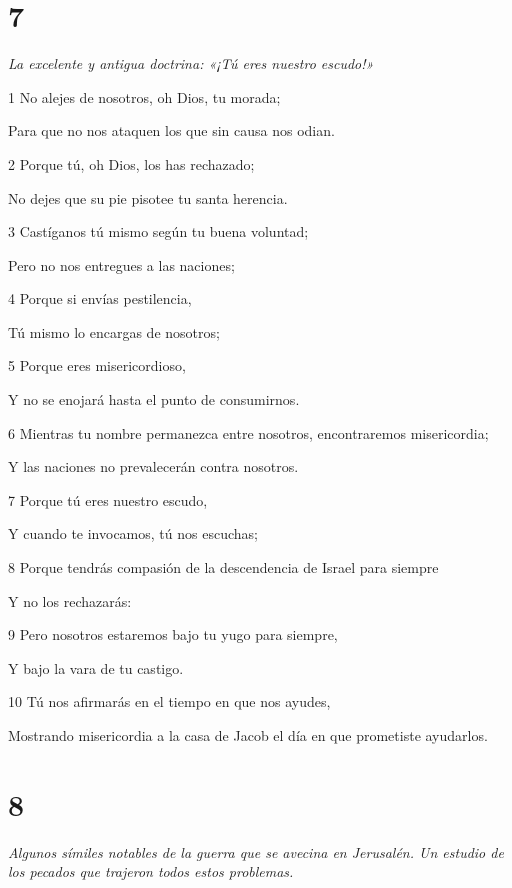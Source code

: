 \chapter{7}

\par \textit{La excelente y antigua doctrina: «¡Tú eres nuestro escudo!»}

\par 1 No alejes de nosotros, oh Dios, tu morada;
\par     Para que no nos ataquen los que sin causa nos odian.
\par 2 Porque tú, oh Dios, los has rechazado;
\par     No dejes que su pie pisotee tu santa herencia.
\par 3 Castíganos tú mismo según tu buena voluntad;
\par     Pero no nos entregues a las naciones;
\par 4 Porque si envías pestilencia,
\par     Tú mismo lo encargas de nosotros;
\par 5 Porque eres misericordioso,
\par     Y no se enojará hasta el punto de consumirnos.
\par   
\par 6 Mientras tu nombre permanezca entre nosotros, encontraremos misericordia;
\par     Y las naciones no prevalecerán contra nosotros.
\par 7 Porque tú eres nuestro escudo,
\par     Y cuando te invocamos, tú nos escuchas;
\par 8 Porque tendrás compasión de la descendencia de Israel para siempre
\par     Y no los rechazarás:
\par 9 Pero nosotros estaremos bajo tu yugo para siempre,
\par     Y bajo la vara de tu castigo.
\par 10 Tú nos afirmarás en el tiempo en que nos ayudes,
\par     Mostrando misericordia a la casa de Jacob el día en que prometiste ayudarlos.

\chapter{8}

\par \textit{Algunos símiles notables de la guerra que se avecina en Jerusalén. Un estudio de los pecados que trajeron todos estos problemas.}

